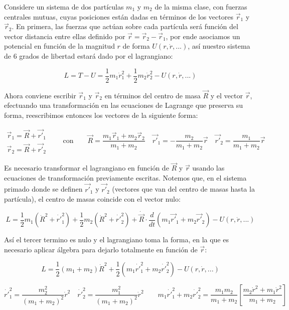 Considere un sistema de dos partículas $m_1$ y $m_2$ de la misma clase, con fuerzas centrales mutuas, cuyas posiciones están dadas en términos de los vectores $\vec{r}_1$ y $\vec{r}_2$. En primera, las fuerzas que actúan sobre cada partícula será función del vector distancia entre ellas definido por $\vec{r}=\vec{r}_2-\vec{r}_1$, por ende asociamos un potencial en función de la magnitud $r$ de forma $U(r,\dot{r},...)$, así nuestro sistema de 6 grados de libertad estará dado por el lagrangiano:
	
	\[
	L=T-U=\frac{1}{2}m_1\dot{r}_1^2+\frac{1}{2}m_2\dot{r}_2^2 - U(r,\dot{r},...)
	\]

	Ahora conviene escribir $\vec{r}_1$ y $\vec{r}_2$ en términos del centro de masa $\vec{R}$ y el vector $\vec{r}$, efectuando una transformación en las ecuaciones de Lagrange que preserva su forma, reescribimos entonces los vectores de la siguiente forma:
	
	\[
	\begin{array}{c}
		\vec{r}_1=\vec{R}+\vec{r'}_1\\\vec{r}_2=\vec{R}+\vec{r'}_2
	\end{array}
	\quad\quad\text{con}\quad\quad \vec{R}=\frac{m_1\vec{r}_1+m_2\vec{r}_2}{m_1+m_2}\quad \vec{r'}_1=-\frac{m_2}{m_1+m_2}\vec{r}\quad\vec{r'}_2=\frac{m_1}{m_1+m_2}\vec{r}
	\]
	
	Es necesario transformar el lagrangiano en función de $\vec{R}$ y $\vec{r}$ usando las ecuaciones de transformación previamente escritas. Notemos que, en el sistema primado donde se definen $\vec{r'}_1$ y $\vec{r'}_2$ (vectores que van del centro de masas hasta la partícula), el centro de masas coincide con el vector nulo:
	
	\[
	L=\frac{1}{2}m_1(\dot{R}^2+\dot{r'}^{2}_1)+\frac{1}{2}m_2(\dot{R}^2+\dot{r'}^{2}_2)+\dot{\vec{R}}\cdot\frac{d}{dt}(m_1\vec{r'}_1+m_2\vec{r'}_2) - U(r,\dot{r},...)
	\]
	
	Así el tercer termino es nulo y el lagrangiano toma la forma, en la que es necesario aplicar álgebra para dejarlo totalmente en función de $\vec{r}$:
	
	\[
	L=\frac{1}{2}(m_1+m_2)\dot{R}^{2}+\frac{1}{2}(m_1\dot{r'}^{2}_1+m_2\dot{r'}^{2}_2)-U(r,\dot{r},...)
	\]
	
	\[
	\dot{r'}^{2}_1=\frac{m_2^{2}}{(m_1+m_2)^{2}}\dot{r}^{2}\quad\dot{r'}^{2}_2=\frac{m_1^{2}}{(m_1+m_2)^{2}}\dot{r}^{2}\quad\quad m_1\dot{r'}^{2}_1+m_2\dot{r'}^{2}_2=\frac{m_1m_2}{m_1+m_2}\left[\frac{m_2\dot{r}^2+m_1\dot{r}^2}{m_1+m_2}\right]
	\]
	
